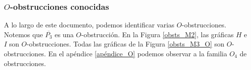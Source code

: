 \subsubsection{$O$-obstrucciones conocidas}

A lo largo de este documento, podemos identificar varias $O$-obstrucciones. Notemos que $\overline{P_3}$ es una $O$-obstrucción. En la Figura \ref{obsts_M2}, las gráficas $H$ e $I$ son $O$-obstrucciones. Todas las gráficas de la Figura \ref{obsts_M3_O} son $O$-obstrucciones. En el apéndice \ref{apéndice_O} podemos observar a la familia $O_4$ de obstrucciones.